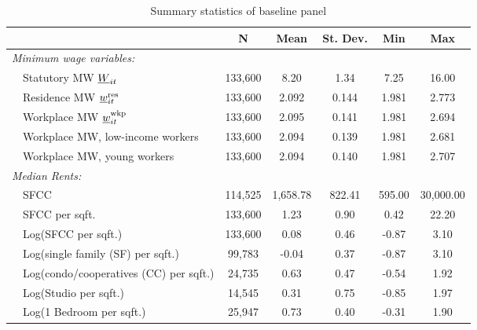 \begin{table}[hbt!] \centering
    \caption{Summary statistics of baseline panel}
    \label{tab:stats_est_panel}
    \begin{tabular}{@{}lccccc@{}}
        \toprule
                                          & \multicolumn{1}{c}{N} 
                                          & \multicolumn{1}{c}{Mean} 
                                          & \multicolumn{1}{c}{St. Dev.} 
                                          & \multicolumn{1}{c}{Min} 
                                          & \multicolumn{1}{c}{Max}                 \\ \midrule
        \textit{Minimum wage variables:}              &       &       &       &       &       \\
        $\quad$Statutory MW $\underline{W}_{it}$                & 133,600  & 8.20  & 1.34  & 7.25  & 16.00  \\
        $\quad$Residence MW $\underline{w}^{\text{res}}_{it}$         & 133,600  & 2.092  & 0.144  & 1.981  & 2.773  \\
        $\quad$Workplace MW $\underline{w}^{\text{wkp}}_{it}$         & 133,600  & 2.095  & 0.141  & 1.981  & 2.694  \\
        $\quad$Workplace MW, low-income workers       & 133,600  & 2.094  & 0.139  & 1.981  & 2.681  \\
        $\quad$Workplace MW, young workers            & 133,600  & 2.094  & 0.140  & 1.981  & 2.707  \\[.3em]
        \textit{Median Rents:}                        &       &       &       &       &       \\
        $\quad$SFCC                                   & 114,525  & 1,658.78  & 822.41  & 595.00  & 30,000.00  \\
        $\quad$SFCC per sqft.                         & 133,600  & 1.23  & 0.90  & 0.42  & 22.20  \\
        $\quad$Log(SFCC per sqft.)                    & 133,600  & 0.08  & 0.46  & -0.87  & 3.10  \\
        $\quad$Log(single family (SF) per sqft.)      & 99,783  & -0.04  & 0.37  & -0.87  & 3.10  \\
        $\quad$Log(condo/cooperatives (CC) per sqft.) & 24,735  & 0.63  & 0.47  & -0.54  & 1.92  \\
        $\quad$Log(Studio per sqft.)                  & 14,545  & 0.31  & 0.75  & -0.85  & 1.97  \\
        $\quad$Log(1 Bedroom per sqft.)               & 25,947  & 0.73  & 0.40  & -0.31  & 1.90  \\

\end{tabular}
\end{table}
